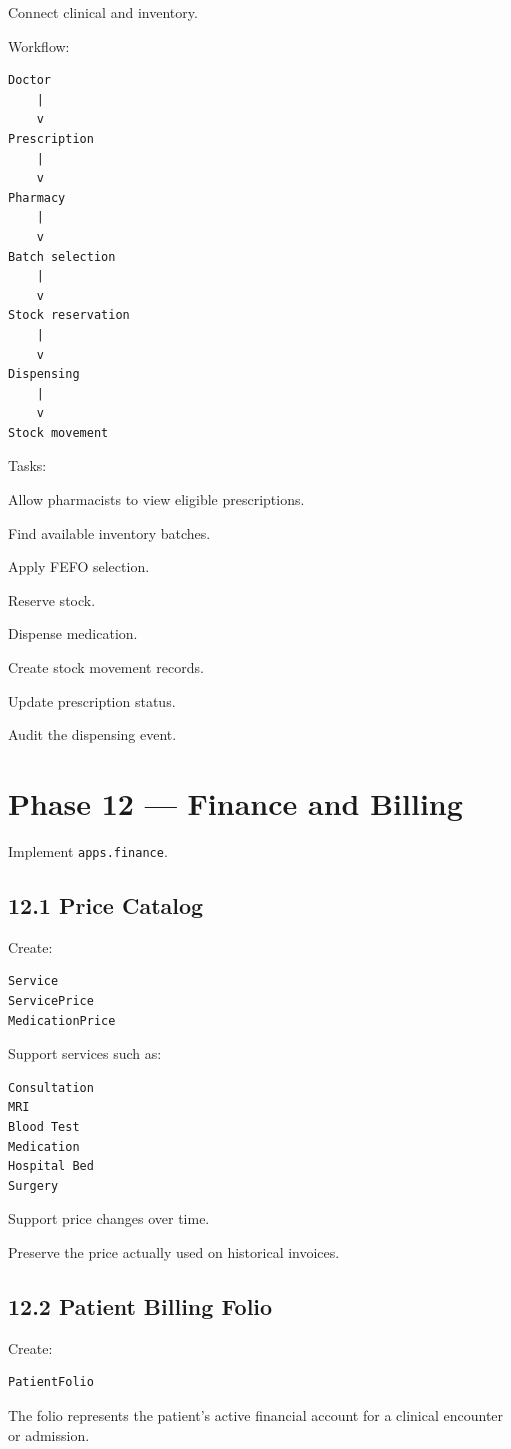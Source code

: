\documentclass[11pt,a4paper]{article}
\newcommand{\task}[1]{\item[$\square$] #1}
\begin{document}
Connect clinical and inventory.

Workflow:

\begin{lstlisting}
Doctor
    |
    v
Prescription
    |
    v
Pharmacy
    |
    v
Batch selection
    |
    v
Stock reservation
    |
    v
Dispensing
    |
    v
Stock movement
\end{lstlisting}

Tasks:

\task{Allow pharmacists to view eligible prescriptions.}
\task{Find available inventory batches.}
\task{Apply FEFO selection.}
\task{Reserve stock.}
\task{Dispense medication.}
\task{Create stock movement records.}
\task{Update prescription status.}
\task{Audit the dispensing event.}

\section{Phase 12 --- Finance and Billing}

Implement \texttt{apps.finance}.

\subsection{12.1 Price Catalog}

Create:

\begin{lstlisting}
Service
ServicePrice
MedicationPrice
\end{lstlisting}

Support services such as:

\begin{lstlisting}
Consultation
MRI
Blood Test
Medication
Hospital Bed
Surgery
\end{lstlisting}

\task{Support price changes over time.}
\task{Preserve the price actually used on historical invoices.}

\subsection{12.2 Patient Billing Folio}

Create:

\begin{lstlisting}
PatientFolio
\end{lstlisting}

The folio represents the patient's active financial account for a
clinical encounter or admission.
\end{document}
